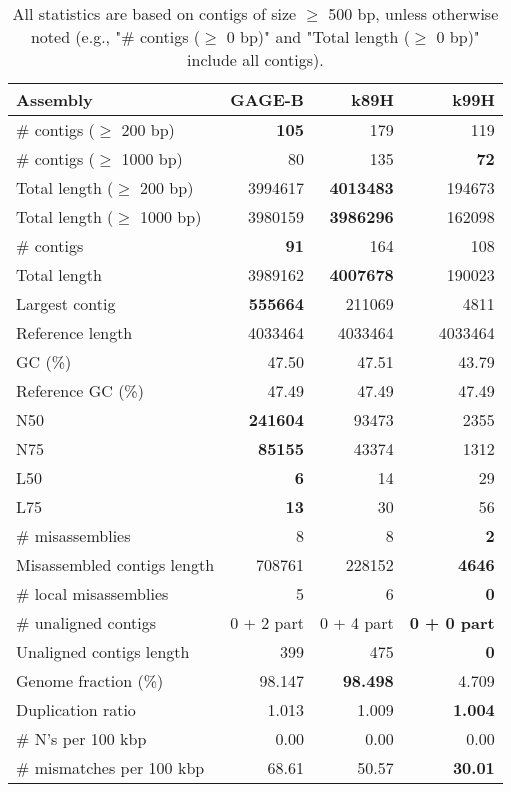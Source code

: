 \documentclass[12pt,a4paper]{article}
\begin{document}
\begin{table}[ht]
\begin{center}
\caption{All statistics are based on contigs of size $\geq$ 500 bp, unless otherwise noted (e.g., "\# contigs ($\geq$ 0 bp)" and "Total length ($\geq$ 0 bp)" include all contigs).}
\begin{tabular}{|l*{3}{|r}|}
\hline
Assembly & GAGE-B & k89H & k99H \\ \hline
\# contigs ($\geq$ 200 bp) & {\bf 105} & 179 & 119 \\ \hline
\# contigs ($\geq$ 1000 bp) & 80 & 135 & {\bf 72} \\ \hline
Total length ($\geq$ 200 bp) & 3994617 & {\bf 4013483} & 194673 \\ \hline
Total length ($\geq$ 1000 bp) & 3980159 & {\bf 3986296} & 162098 \\ \hline
\# contigs & {\bf 91} & 164 & 108 \\ \hline
Total length & 3989162 & {\bf 4007678} & 190023 \\ \hline
Largest contig & {\bf 555664} & 211069 & 4811 \\ \hline
Reference length & 4033464 & 4033464 & 4033464 \\ \hline
GC (\%) & 47.50 & 47.51 & 43.79 \\ \hline
Reference GC (\%) & 47.49 & 47.49 & 47.49 \\ \hline
N50 & {\bf 241604} & 93473 & 2355 \\ \hline
N75 & {\bf 85155} & 43374 & 1312 \\ \hline
L50 & {\bf 6} & 14 & 29 \\ \hline
L75 & {\bf 13} & 30 & 56 \\ \hline
\# misassemblies & 8 & 8 & {\bf 2} \\ \hline
Misassembled contigs length & 708761 & 228152 & {\bf 4646} \\ \hline
\# local misassemblies & 5 & 6 & {\bf 0} \\ \hline
\# unaligned contigs & 0 + 2 part & 0 + 4 part & {\bf 0 + 0 part} \\ \hline
Unaligned contigs length & 399 & 475 & {\bf 0} \\ \hline
Genome fraction (\%) & 98.147 & {\bf 98.498} & 4.709 \\ \hline
Duplication ratio & 1.013 & 1.009 & {\bf 1.004} \\ \hline
\# N's per 100 kbp & 0.00 & 0.00 & 0.00 \\ \hline
\# mismatches per 100 kbp & 68.61 & 50.57 & {\bf 30.01} \\ \hline

\end{tabular}
\end{center}
\end{table}
\end{document}
